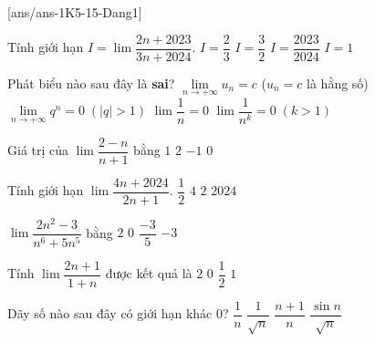 [ans/ans-1K5-15-Dang1]
\begin{ex}%
	Tính giới hạn $I=\lim\dfrac{2n+2023}{3n+2024}$. 
	\choice
	{\True $I=\dfrac{2}{3}$}
	{$I=\dfrac{3}{2}$}
	{$I=\dfrac{2023}{2024}$}
	{$I=1$}
\end{ex}
\begin{ex}%
	Phát biểu nào sau đây là \textbf{sai}?
	\choice
	{$\lim \limits_{n \to +\infty}u_n=c$ ($u_n=c$ là hằng số)}
	{\True $\lim \limits_{n \to +\infty}q^n=0 \;(|q|>1)$}
	{$\lim\dfrac{1}{n}=0$}
	{$\lim\dfrac{1}{n^k}=0 \; (k>1)$}
\end{ex}
\begin{ex}%
	Giá trị của $\lim\dfrac{2-n}{n+1}$ bằng
	\choice
	{$1$}
	{$2$}
	{\True $-1$}
	{$0$}
\end{ex}
\begin{ex}%
	Tính giới hạn $\lim\dfrac{4n+2024}{2n+1}$. 
	\choice
	{$\dfrac{1}{2}$}
	{$4$}
	{\True $2$}
	{$2024$}
\end{ex}
\begin{ex}%
	$\lim\dfrac{2n^2-3}{n^6+5n^5}$ bằng 
	\choice
	{$2$}
	{\True $0$}
	{$\dfrac{-3}{5}$}
	{$-3$}
\end{ex}
\begin{ex}%
	Tính $\lim\dfrac{2n+1}{1+n}$ được kết quả là
	\choice
	{\True $2$}
	{$0$}
	{$\dfrac{1}{2}$}
	{$1$}
\end{ex}

\begin{ex}%
	Dãy số nào sau đây có giới hạn khác $0$?
	\choice
	{$\dfrac{1}{n}$}
	{$\dfrac{1}{\sqrt{n}}$}
	{\True $\dfrac{n+1}{n}$}
	{$\dfrac{\sin n}{\sqrt{n}}$}
\end{ex}

